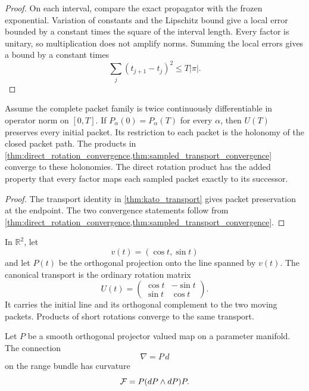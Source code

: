 \begin{proof}
On each interval, compare the exact propagator with the frozen exponential.  Variation of constants and the Lipschitz bound give a local error bounded by a constant times the square of the interval length.  Every factor is unitary, so multiplication does not amplify norms.  Summing the local errors gives a bound by a constant times
\[
\sum_j(t_{j+1}-t_j)^2
\le
T|\pi|.
\]
\end{proof}

\begin{corollary}\label{cor:continuous_holonomy}
Assume the complete packet family is twice continuously differentiable in operator norm on $[0,T]$. If $P_\alpha(0)=P_\alpha(T)$ for every $\alpha$, then $U(T)$ preserves every initial packet.  Its restriction to each packet is the holonomy of the closed packet path.  The products in \cref{thm:direct_rotation_convergence,thm:sampled_transport_convergence} converge to these holonomies.  The direct rotation product has the added property that every factor maps each sampled packet exactly to its successor.
\end{corollary}

\begin{proof}
The transport identity in \cref{thm:kato_transport} gives packet preservation at the endpoint.  The two convergence statements follow from \cref{thm:direct_rotation_convergence,thm:sampled_transport_convergence}.
\end{proof}

\begin{example}\label{ex:rotating_line}
In $\mathbb R^2$, let
\[
v(t)=(\cos t,\sin t)
\]
and let $P(t)$ be the orthogonal projection onto the line spanned by $v(t)$.  The canonical transport is the ordinary rotation matrix
\[
U(t)=
\begin{pmatrix}
\cos t&-\sin t\\
\sin t&\cos t
\end{pmatrix}.
\]
It carries the initial line and its orthogonal complement to the two moving packets.  Products of short rotations converge to the same transport.
\end{example}


\begin{standardfact}\label{fact:projected_curvature}
Let $P$ be a smooth orthogonal projector valued map on a parameter manifold.  The connection
\[
\nabla=P\,d
\]
on the range bundle has curvature
\[
\mathcal F=P(dP\wedge dP)P.
\]
\end{standardfact}

